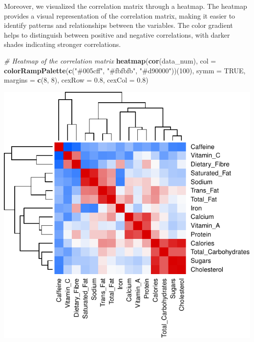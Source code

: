 \documentclass[
]{article}
\newenvironment{Shaded}{\begin{snugshade}}{\end{snugshade}}
\newcommand{\AttributeTok}[1]{\textcolor[rgb]{0.13,0.29,0.53}{#1}}
\newcommand{\CommentTok}[1]{\textcolor[rgb]{0.56,0.35,0.01}{\textit{#1}}}
\newcommand{\ConstantTok}[1]{\textcolor[rgb]{0.56,0.35,0.01}{#1}}
\newcommand{\DecValTok}[1]{\textcolor[rgb]{0.00,0.00,0.81}{#1}}
\newcommand{\FloatTok}[1]{\textcolor[rgb]{0.00,0.00,0.81}{#1}}
\newcommand{\FunctionTok}[1]{\textcolor[rgb]{0.13,0.29,0.53}{\textbf{#1}}}
\newcommand{\NormalTok}[1]{#1}
\newcommand{\StringTok}[1]{\textcolor[rgb]{0.31,0.60,0.02}{#1}}
\begin{document}
Moreover, we visualized the correlation matrix through a heatmap. The
heatmap provides a visual representation of the correlation matrix,
making it easier to identify patterns and relationships between the
variables. The color gradient helps to distinguish between positive and
negative correlations, with darker shades indicating stronger
correlations.

\begin{Shaded}
\begin{Highlighting}[]
\CommentTok{\# Heatmap of the correlation matrix}
\FunctionTok{heatmap}\NormalTok{(}\FunctionTok{cor}\NormalTok{(data\_num), }
        \AttributeTok{col =} \FunctionTok{colorRampPalette}\NormalTok{(}\FunctionTok{c}\NormalTok{(}\StringTok{"\#005cff"}\NormalTok{, }\StringTok{"\#fbfbfb"}\NormalTok{, }\StringTok{"\#d90000"}\NormalTok{))(}\DecValTok{100}\NormalTok{), }
        \AttributeTok{symm =} \ConstantTok{TRUE}\NormalTok{, }
        \AttributeTok{margins =} \FunctionTok{c}\NormalTok{(}\DecValTok{8}\NormalTok{, }\DecValTok{8}\NormalTok{), }
        \AttributeTok{cexRow =} \FloatTok{0.8}\NormalTok{,}
        \AttributeTok{cexCol =} \FloatTok{0.8}\NormalTok{)}
\end{Highlighting}
\end{Shaded}

\begin{center}\includegraphics{Statistical_Learning_Final_Report_files/figure-latex/correlation_analysis_heatmap-1} \end{center}
\end{document}
